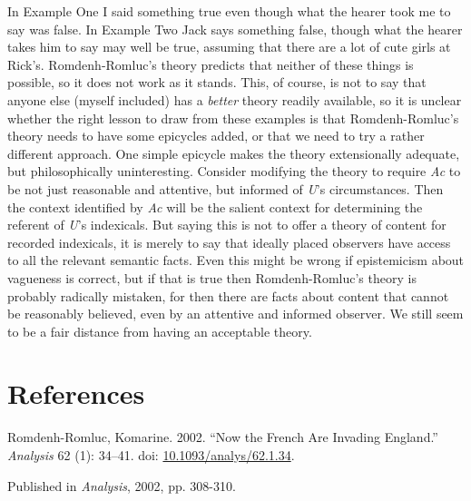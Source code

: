 \documentclass[
  11pt,
  letterpaper,
  DIV=11,
  numbers=noendperiod,
  twoside]{scrartcl}
\newlength{\cslhangindent}
\newenvironment{CSLReferences}[2] %
 {\begin{list}{}{%
  \setlength{\itemindent}{0pt}
  \setlength{\leftmargin}{0pt}
  \setlength{\parsep}{0pt}
  \ifodd #1
   \setlength{\leftmargin}{\cslhangindent}
   \setlength{\itemindent}{-1\cslhangindent}
  \fi
  \setlength{\itemsep}{#2\baselineskip}}}
 {\end{list}}
\begin{document}
In Example One I said something true even though what the hearer took me
to say was false. In Example Two Jack says something false, though what
the hearer takes him to say may well be true, assuming that there are a
lot of cute girls at Rick's. Romdenh-Romluc's theory predicts that
neither of these things is possible, so it does not work as it stands.
This, of course, is not to say that anyone else (myself included) has a
\emph{better} theory readily available, so it is unclear whether the
right lesson to draw from these examples is that Romdenh-Romluc's theory
needs to have some epicycles added, or that we need to try a rather
different approach. One simple epicycle makes the theory extensionally
adequate, but philosophically uninteresting. Consider modifying the
theory to require \emph{Ac} to be not just reasonable and attentive, but
informed of \emph{U}'s circumstances. Then the context identified by
\emph{Ac} will be the salient context for determining the referent of
\emph{U}'s indexicals. But saying this is not to offer a theory of
content for recorded indexicals, it is merely to say that ideally placed
observers have access to all the relevant semantic facts. Even this
might be wrong if epistemicism about vagueness is correct, but if that
is true then Romdenh-Romluc's theory is probably radically mistaken, for
then there are facts about content that cannot be reasonably believed,
even by an attentive and informed observer. We still seem to be a fair
distance from having an acceptable theory.

\section*{References}\label{references}

\label{refs}
\begin{CSLReferences}{1}{0}
Romdenh-Romluc, Komarine. 2002. {``Now the French Are Invading
England.''} \emph{Analysis} 62 (1): 34--41. doi:
\href{https://doi.org/10.1093/analys/62.1.34}{10.1093/analys/62.1.34}.

\end{CSLReferences}



\noindent Published in\emph{
Analysis}, 2002, pp. 308-310.
\end{document}
